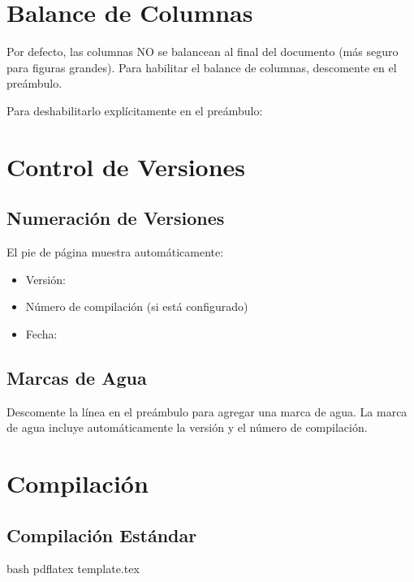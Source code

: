 \documentclass{pt-article}
\begin{document}
\section{Balance de Columnas}

Por defecto, las columnas NO se balancean al final del documento (más seguro
para figuras grandes). Para habilitar el balance de columnas, descomente
 en el preámbulo.

Para deshabilitarlo explícitamente en el preámbulo:


\section{Control de Versiones}

\subsection{Numeración de Versiones}

El pie de página muestra automáticamente:
\begin{itemize}
    \item Versión: \docversion
    \item Número de compilación (si está configurado)
    \item Fecha: \todayymd
\end{itemize}

\subsection{Marcas de Agua}

Descomente la línea  en el
preámbulo para agregar una marca de agua. La marca de agua incluye
automáticamente la versión y el número de compilación.

\section{Compilación}

\subsection{Compilación Estándar}

\begin{ptprintcode}{bash}
pdflatex template.tex
\end{ptprintcode}
\end{document}
